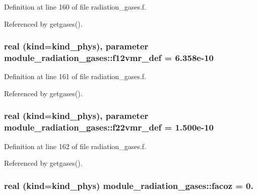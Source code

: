 Definition at line 160 of file radiation\+\_\+gases.\+f.



Referenced by getgases().

\subsubsection[{\texorpdfstring{f12vmr\+\_\+def}{f12vmr_def}}]{\setlength{\rightskip}{0pt plus 5cm}real (kind=kind\+\_\+phys), parameter module\+\_\+radiation\+\_\+gases\+::f12vmr\+\_\+def = 6.\+358e-\/10\hspace{0.3cm}{\ttfamily [private]}}\hypertarget{group__module__radiation__gases_ga96d4f78070f30010626e0824b3421250}{}\label{group__module__radiation__gases_ga96d4f78070f30010626e0824b3421250}


Definition at line 161 of file radiation\+\_\+gases.\+f.



Referenced by getgases().

\subsubsection[{\texorpdfstring{f22vmr\+\_\+def}{f22vmr_def}}]{\setlength{\rightskip}{0pt plus 5cm}real (kind=kind\+\_\+phys), parameter module\+\_\+radiation\+\_\+gases\+::f22vmr\+\_\+def = 1.\+500e-\/10\hspace{0.3cm}{\ttfamily [private]}}\hypertarget{group__module__radiation__gases_gafd0018e96811ac64ef2abd8cab821eb5}{}\label{group__module__radiation__gases_gafd0018e96811ac64ef2abd8cab821eb5}


Definition at line 162 of file radiation\+\_\+gases.\+f.



Referenced by getgases().

\subsubsection[{\texorpdfstring{facoz}{facoz}}]{\setlength{\rightskip}{0pt plus 5cm}real (kind=kind\+\_\+phys) module\+\_\+radiation\+\_\+gases\+::facoz = 0.\hspace{0.3cm}{\ttfamily [private]}}\hypertarget{group__module__radiation__gases_gac7c9fd8ece69872fdef473020ea03d6b}{}\label{group__module__radiation__gases_gac7c9fd8ece69872fdef473020ea03d6b}


